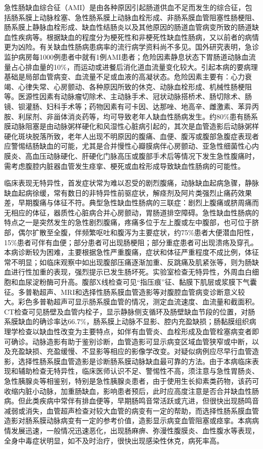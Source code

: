 急性肠缺血综合征（AMI）是由各种原因引起肠道供血不足而发生的综合征，包括肠系膜上动脉栓塞、急性肠系膜上动脉血栓形成、非肠系膜血管阻塞性肠梗阻、肠系膜上静脉血栓形成、缺血性结肠炎以及其他原因的肠道血管病变所致的肠道缺血性疾病等。根据缺血的程度分为梗死性和非梗死性缺血性肠病，又以前者的病情更为凶险。有关缺血性肠病患病率的流行病学资料尚不多见。国外研究表明，急诊监护病房每1000例患者中就有1例AMI患者；危险因素静息状态下胃肠道动脉血流量占心排血量的10\%，而运动或进餐后消化道血流量变化较大。引起本病的要病理基础是局部血管病变、血流量不足或血液的高凝状态。危险因素主要有：心力衰竭、心律失常、心房颤动、各种原因所致的休克、动脉血栓形成、机械性肠梗阻等。医源性因素有动脉瘤切除术、主动脉手术、冠状动脉搭桥术、肠切除术、肠镜、钡灌肠、妇科手术等；药物因素有可卡因、达那唑、地高辛、雌激素、苯异丙胺、利尿剂、非甾体消炎药等，均可导致老年人缺血性肠病发生。约80\%患有肠系膜动脉阻塞是由动脉粥样硬化和风湿性心脏病引起的，其次是血管造影后动脉粥样硬化斑块脱落所致，老年人出现不明原因的腹痛、血便、腹泻或腹部急腹症表现者应警惕结肠缺血的可能，尤其是合并慢性心瓣膜病伴心房颤动、亚急性细菌性心内膜炎、高血压动脉硬化、肝硬化门脉高压或腹部手术后等情况下发生急性腹痛时，需考虑腹腔内脏器血管发生痉挛、梗死或血栓形成导致缺血性肠病的可能性。

临床表现无特异性，首发症状常为难以忍受的剧烈腹痛，动脉缺血起病急骤，静脉缺血起病徐缓，常有数日的非特异性前驱症状，解痉剂及阿片类强烈止痛药效果差，早期腹痛与体征不符。典型急性缺血性肠病的三联症：剧烈上腹痛或脐周痛而无相应的体征，器质性心脏病合并心房颤动，胃肠道排空障碍。急性缺血性肠病的特点之一是突然发生的急性剧烈腹痛，疼痛多位于左上腹或左中腹部，也可位于脐部，偶尔扩散至全腹，伴频繁呕吐和腹泻为主要症状，约75\%患者大便潜血阳性，15\%患者可伴有血便；部分患者可出现肠梗阻；部分重症患者可出现溃疡及穿孔。本病诊断较为困难，主要根据急性严重腹痛，症状和体征严重程度不成比例，体征常不明显；如临床观察中如出现腹部压痛逐渐加重、反跳痛及肌紧张等，则为肠缺血进行性加重的表现，强烈提示已发生肠坏死。实验室检查无特异性，外周血白细胞和血尿淀粉酶可升高。腹部X线检查可见“指压痕”征、黏膜下肌层或浆膜下气囊征。多普勒超声、MRI和选择性肠系膜血管造影等对腹腔血管病变诊断意义较大。彩色多普勒超声可显示肠系膜血管的情况，测定血流速度、血流量和截面积。CT检查可见肠壁及血管内栓子，显示静脉侧支循环及肠壁缺血节段的位置，对肠系膜缺血的确诊率达66.7\%，肠系膜上动脉不显影、腔内充盈缺损；肠黏膜组织病理学检查以缺血性改变为主要特点，如伴有血管炎、血栓形成及血管栓塞病变者即可确诊。动脉造影有助于鉴别诊断，血管造影可显示病变区域血管狭窄或中断，以及充盈缺损、充盈缓慢、不显影等相应的影像学改变。对疑似病例应尽早行血管造影，选择性肠系膜血管造影是诊断肠系膜动脉缺血最可靠的方法。由于本病临床表现和辅助检查无特异性，临床医师认识不足、警惕性不高，须注意与急性胃肠炎、急性胰腺炎等相鉴别，特别是急性胰腺炎患者，由于使用生长抑素类药物，该药可收缩内脏小动脉，加重肠缺血，影响患者预后，此时应高度注意是否合并缺血性肠病。但此类疾病中常伴有排血便等，早期肠鸣音常活跃或亢进，但很快出现肠鸣音减弱或消失，血管超声检查对较大血管的病变有一定的帮助，而选择性肠系膜血管造影对肠系膜动脉病变有一定的参考价值，造影显示病变血管阻塞或痉挛。本病病情发展迅速，一般情况迅速恶化，出现肠麻痹、弥漫性腹膜炎、血性腹水等表现，全身中毒症状明显，如不及时治疗，很快出现感染性休克，病死率高。


